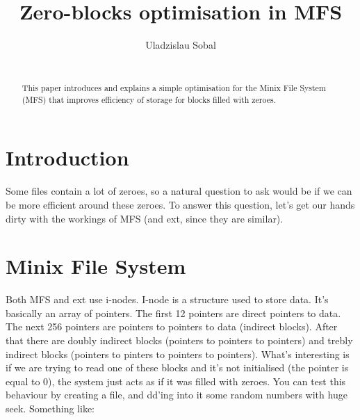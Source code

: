 \documentclass{sig-alternate-05-2015}
\begin{document}




%

\title{Zero-blocks optimisation in MFS}

%
\author{
\alignauthor
Uladzislau Sobal\\
       \\
}

\maketitle
\begin{abstract}
    This paper introduces and explains a simple optimisation for the Minix File System (MFS) that
    improves efficiency of storage for blocks filled with zeroes.
\end{abstract}

\section{Introduction}

Some files contain a lot of zeroes, so a natural question to ask would be if we can be more efficient
around these zeroes. To answer this question, let's get our hands dirty with the workings of MFS 
(and ext, since they are similar).

\section{Minix File System}
Both MFS and ext use i-nodes. I-node is a structure used to store data. It's basically an array of pointers.
The first 12 pointers are direct pointers to data.
The next 256 pointers are pointers to pointers to data (indirect blocks).
After that there are doubly indirect blocks (pointers to pointers to pointers)
and trebly indirect blocks (pointers to pinters to pointers to pointers).
What's interesting is if we are trying to read one of these blocks and it's not initialised
(the pointer is equal to 0), the system
just acts as if it was filled with zeroes. You can test this behaviour by creating a file, and 
dd'ing into it some random numbers with huge seek. 
Something like:
\end{document}
